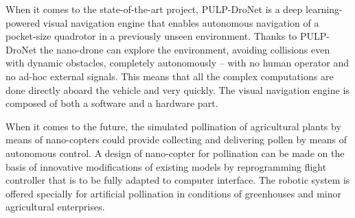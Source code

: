 When it comes to the state-of-the-art project, PULP-DroNet is a deep learning-powered visual navigation engine that enables autonomous navigation of a pocket-size quadrotor in a previously unseen environment. Thanks to PULP-DroNet the nano-drone can explore the environment, avoiding collisions even with dynamic obstacles, completely autonomously -- with no human operator and no ad-hoc external signals. This means that all the complex computations are done directly aboard the vehicle and very quickly. The visual navigation engine is composed of both a software and a hardware part. \cite{Niculescu2021}

When it comes to the future, the simulated pollination of agricultural plants by means of nano-copters could provide collecting and delivering pollen by means of autonomous control. A design of nano-copter for pollination can be made on the basis of innovative modifications of existing models by reprogramming flight controller that is to be fully adapted to computer interface. The robotic system is offered specially for artificial pollination in conditions of greenhouses and minor agricultural enterprises. \cite{Abutalipov2016}
